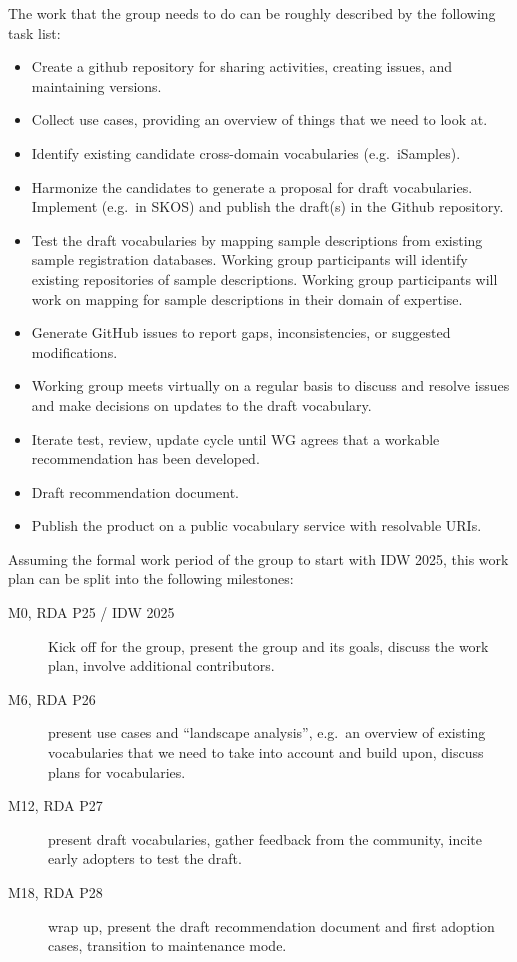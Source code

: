\documentclass{scrartcl}
\begin{document}
The work that the group needs to do can be roughly described by the
following task list:
\begin{itemize}
\item Create a github repository for sharing activities, creating
  issues, and maintaining versions.
\item Collect use cases, providing an overview of things that we need
  to look at.
\item Identify existing candidate cross-domain vocabularies
  (e.g.\ iSamples).
\item Harmonize the candidates to generate a proposal for draft
  vocabularies.  Implement (e.g.\ in SKOS) and publish the draft(s) in
  the Github repository.
\item Test the draft vocabularies by mapping sample descriptions from
  existing sample registration databases.  Working group participants
  will identify existing repositories of sample descriptions.  Working
  group participants will work on mapping for sample descriptions in
  their domain of expertise.
\item Generate GitHub issues to report gaps, inconsistencies, or
  suggested modifications.
\item Working group meets virtually on a regular basis to discuss and
  resolve issues and make decisions on updates to the draft
  vocabulary.
\item Iterate test, review, update cycle until WG agrees that a
  workable recommendation has been developed.
\item Draft recommendation document.
\item Publish the product on a public vocabulary service with
  resolvable URIs.
\end{itemize}

Assuming the formal work period of the group to start with IDW 2025,
this work plan can be split into the following milestones:
\begin{description}
\item[M0, RDA P25 / IDW 2025] Kick off for the group, present the
  group and its goals, discuss the work plan, involve additional
  contributors.
\item[M6, RDA P26] present use cases and ``landscape analysis'',
  e.g.\ an overview of existing vocabularies that we need to take into
  account and build upon, discuss plans for vocabularies.
\item[M12, RDA P27] present draft vocabularies, gather feedback from
  the community, incite early adopters to test the draft.
\item[M18, RDA P28] wrap up, present the draft recommendation document
  and first adoption cases, transition to maintenance mode.
\end{description}
\end{document}
